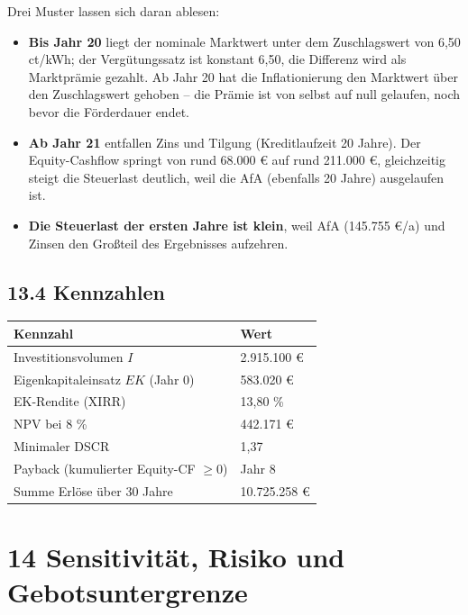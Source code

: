 \documentclass[
  a4paper,
  10pt]{article}
\providecommand{\tightlist}{%
  \setlength{\itemsep}{0pt}\setlength{\parskip}{0pt}}
\begin{document}
Drei Muster lassen sich daran ablesen:

\begin{itemize}
\tightlist
\item
  \textbf{Bis Jahr 20} liegt der nominale Marktwert unter dem
  Zuschlagswert von 6,50 ct/kWh; der Vergütungssatz ist konstant 6,50,
  die Differenz wird als Marktprämie gezahlt. Ab Jahr 20 hat die
  Inflationierung den Marktwert über den Zuschlagswert gehoben -- die
  Prämie ist von selbst auf null gelaufen, noch bevor die Förderdauer
  endet.
\item
  \textbf{Ab Jahr 21} entfallen Zins und Tilgung (Kreditlaufzeit 20
  Jahre). Der Equity-Cashflow springt von rund 68.000 € auf rund 211.000
  €, gleichzeitig steigt die Steuerlast deutlich, weil die AfA
  (ebenfalls 20 Jahre) ausgelaufen ist.
\item
  \textbf{Die Steuerlast der ersten Jahre ist klein}, weil AfA (145.755
  €/a) und Zinsen den Großteil des Ergebnisses aufzehren.
\end{itemize}

\hypertarget{kennzahlen}{%
\subsection{13.4 Kennzahlen}\label{kennzahlen}}

\begin{longtable}[]{@{}ll@{}}
\toprule\noalign{}
Kennzahl & Wert \\
\midrule\noalign{}
\endhead
\bottomrule\noalign{}
\endlastfoot
Investitionsvolumen \(I\) & 2.915.100 € \\
Eigenkapitaleinsatz \(EK\) (Jahr 0) & 583.020 € \\
EK-Rendite (XIRR) & 13,80 \% \\
NPV bei 8 \% & 442.171 € \\
Minimaler DSCR & 1,37 \\
Payback (kumulierter Equity-CF \(\geq 0\)) & Jahr 8 \\
Summe Erlöse über 30 Jahre & 10.725.258 € \\
\end{longtable}

\hypertarget{sensitivituxe4t-risiko-und-gebotsuntergrenze}{%
\section{14 Sensitivität, Risiko und
Gebotsuntergrenze}\label{sensitivituxe4t-risiko-und-gebotsuntergrenze}}
\end{document}
